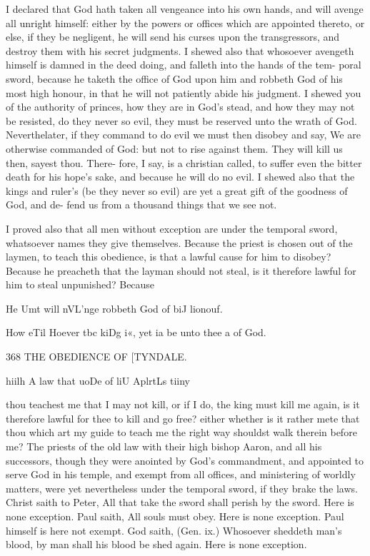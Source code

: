 \documentclass{custom}
\begin{document}
{I declared that God hath taken all vengeance into his 
own hands, and will avenge all unright himself: either by 
the powers or offices which are appointed thereto, or else, 
if they be negligent, he will send his curses upon the 
transgressors, and destroy them with his secret judgments. 
I shewed also that whosoever avengeth himself is damned 
in the deed doing, and falleth into the hands of the tem- 
poral sword, because he taketh the office of God upon him 
and robbeth God of his most high honour, in that he will 
not patiently abide his judgment. I shewed you of the 
authority of princes, how they are in God's stead, and how 
they may not be resisted, do they never so evil, they must 
be reserved unto the wrath of God. Neverthelater, if 
they command to do evil we must then disobey and say, 
We are otherwise commanded of God: but not to rise 
against them. They will kill us then, sayest thou. There- 
fore, I say, is a christian called, to suffer even the bitter 
death for his hope's sake, and because he will do no evil. 
I shewed also that the kings and ruler's (be they never so 
evil) are yet a great gift of the goodness of God, and de- 
fend us from a thousand things that we see not. 

I proved also that all men without exception are under 
the temporal sword, whatsoever names they give themselves. 
Because the priest is chosen out of the laymen, to teach 
this obedience, is that a lawful cause for him to disobey? 
Because he preacheth that the layman should not steal, is 
it therefore lawful for him to steal unpunished? Because 

He Umt 
will nVL'nge 
robbeth 
God of biJ 
lionouf. 

How eTil 
Hoever tbc 
kiDg i«, 
yet ia be 
unto thee a 
of God. 


368
THE OBEDIENCE OF
[TYNDALE.

hiilh A law 
that uoDe 
of liU 
AplrtLs tiiny 

thou teachest me that I may not kill, or if I do, the king 
must kill me again, is it therefore lawful for thee to kill 
and go free? either whether is it rather mete that thou 
which art my guide to teach me the right way shouldst 
walk therein before me? The priests of the old law with 
their high bishop Aaron, and all his successors, though 
they were anointed by God's commandment, and appointed 
to serve God in his temple, and exempt from all offices, 
and ministering of worldly matters, were yet nevertheless 
under the temporal sword, if they brake the laws. Christ 
saith to Peter, All that take the sword shall perish by the 
sword. Here is none exception. Paul saith, All souls 
must obey. Here is none exception. Paul himself is 
here not exempt. God saith, (Gen. ix.) Whosoever 
sheddeth man's blood, by man shall his blood be shed 
again. Here is none exception. 

}
\end{document}
